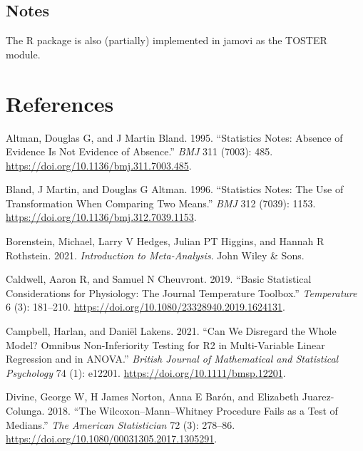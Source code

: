 \documentclass[
]{interact}
\newlength{\cslhangindent}
\newlength{\cslentryspacingunit} %
\newenvironment{CSLReferences}[2] %
 {%
  \setlength{\parindent}{0pt}
  \ifodd #1
  \let\oldpar\par
  \def\par{\hangindent=\cslhangindent\oldpar}
  \fi
  \setlength{\parskip}{#2\cslentryspacingunit}
 }%
 {}
\begin{document}
\hypertarget{notes}{%
\subsection*{Notes}\label{notes}}

The R package is also (partially) implemented in jamovi as the TOSTER
module.

\newpage

\hypertarget{references}{%
\section{References}\label{references}}

\hypertarget{refs}{}
\begin{CSLReferences}{1}{0}
\leavevmode{}%
Altman, Douglas G, and J Martin Bland. 1995. {``Statistics Notes:
Absence of Evidence Is Not Evidence of Absence.''} \emph{BMJ} 311
(7003): 485. \url{https://doi.org/10.1136/bmj.311.7003.485}.

\leavevmode{}%
Bland, J Martin, and Douglas G Altman. 1996. {``Statistics Notes: The
Use of Transformation When Comparing Two Means.''} \emph{BMJ} 312
(7039): 1153. \url{https://doi.org/10.1136/bmj.312.7039.1153}.

\leavevmode{}%
Borenstein, Michael, Larry V Hedges, Julian PT Higgins, and Hannah R
Rothstein. 2021. \emph{Introduction to Meta-Analysis}. John Wiley \&
Sons.

\leavevmode{}%
Caldwell, Aaron R, and Samuel N Cheuvront. 2019. {``Basic Statistical
Considerations for Physiology: The Journal Temperature Toolbox.''}
\emph{Temperature} 6 (3): 181--210.
\url{https://doi.org/10.1080/23328940.2019.1624131}.

\leavevmode{}%
Campbell, Harlan, and Daniël Lakens. 2021. {``Can We Disregard the Whole
Model? Omnibus Non-Inferiority Testing for R2 in Multi-Variable Linear
Regression and in ANOVA.''} \emph{British Journal of Mathematical and
Statistical Psychology} 74 (1): e12201.
\url{https://doi.org/10.1111/bmsp.12201}.

\leavevmode{}%
Divine, George W, H James Norton, Anna E Barón, and Elizabeth
Juarez-Colunga. 2018. {``The Wilcoxon--Mann--Whitney Procedure Fails as
a Test of Medians.''} \emph{The American Statistician} 72 (3): 278--86.
\url{https://doi.org/10.1080/00031305.2017.1305291}.


\end{CSLReferences}
\end{document}
